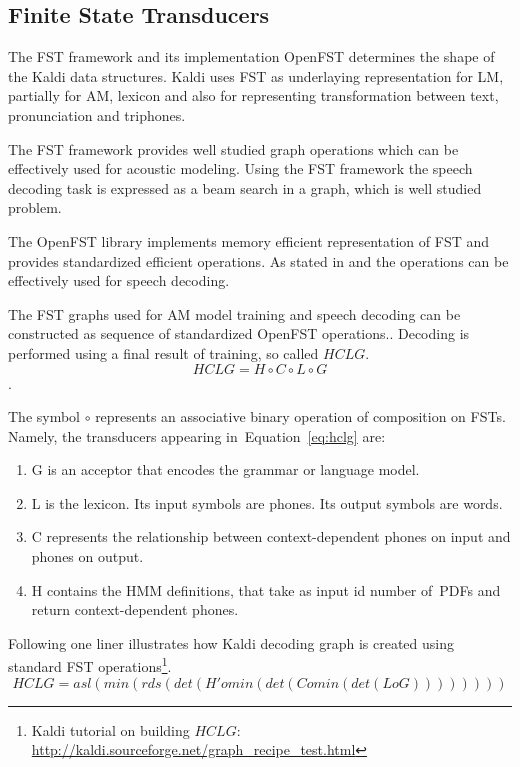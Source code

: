 {\subsection{Finite State Transducers} 
\label{sec:fst}
The \acl{FST} framework and its implementation OpenFST determines the shape of the Kaldi data structures.
Kaldi uses \ac{FST} as underlaying representation for \ac{LM}, partially for \ac{AM}, lexicon and also for representing transformation between text, pronunciation and triphones.

The \ac{FST} framework provides well studied graph operations\cite{mohri2002weighted} which can be effectively used for acoustic modeling.
Using the \ac{FST} framework the speech decoding task is expressed as a beam search in a graph, which is well studied problem.

The OpenFST library implements memory efficient representation of \ac{FST} and
provides standardized efficient operations.
As stated in \cite{mohri2002weighted} and \cite{povey2011kaldi} the operations can be effectively used
for speech decoding. 

The \ac{FST} graphs used for \ac{AM} model training and speech decoding can be constructed as sequence of standardized OpenFST operations.\cite{mohri2002weighted}.
Decoding is performed using a final result of training, so called  $HCLG$. 
\begin{equation} \label{eq:hclg}
HCLG = H\circ C\circ L\circ G
\end{equation}.

The symbol $\circ$ represents an associative binary operation of composition on \acp{FST}.
Namely, the transducers appearing in~Equation~\ref{eq:hclg} are:
\begin{enumerate}
    \item G is an acceptor that encodes the grammar or language model.
    \item L is the lexicon. Its input symbols are phones. Its output symbols are words.
    \item C represents the relationship between context-dependent phones on input and phones on output.
    \item H contains the \ac{HMM} definitions, that take as input id number of~\acp{PDF} and return context-dependent phones.
\end{enumerate}

Following one liner illustrates how Kaldi decoding graph is created using standard \ac{FST} operations\footnote{Kaldi tutorial on building $HCLG$: \url{http://kaldi.sourceforge.net/graph_recipe_test.html}}.\cite{mohri2002weighted}
\begin{equation}
   HCLG = asl(min(rds(det(H' o min(det(C o min(det(L o G)))))))) 
\end{equation}

}
